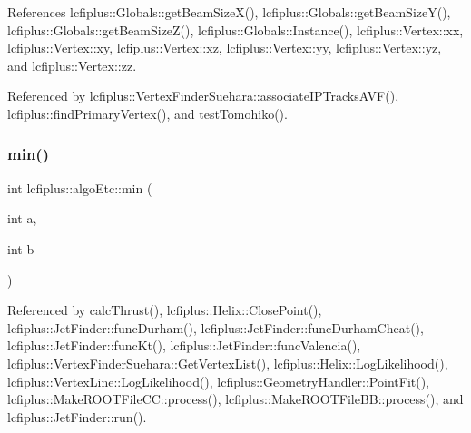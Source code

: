 References lcfiplus\+::\+Globals\+::get\+Beam\+Size\+X(), lcfiplus\+::\+Globals\+::get\+Beam\+Size\+Y(), lcfiplus\+::\+Globals\+::get\+Beam\+Size\+Z(), lcfiplus\+::\+Globals\+::\+Instance(), lcfiplus\+::\+Vertex\+::xx, lcfiplus\+::\+Vertex\+::xy, lcfiplus\+::\+Vertex\+::xz, lcfiplus\+::\+Vertex\+::yy, lcfiplus\+::\+Vertex\+::yz, and lcfiplus\+::\+Vertex\+::zz.



Referenced by lcfiplus\+::\+Vertex\+Finder\+Suehara\+::associate\+I\+P\+Tracks\+A\+V\+F(), lcfiplus\+::find\+Primary\+Vertex(), and test\+Tomohiko().

\mbox{\label{namespacelcfiplus_1_1algoEtc_aae88816dd58310d90c39512aa706c2ba}} 
\subsubsection{min()}
{\footnotesize\ttfamily int lcfiplus\+::algo\+Etc\+::min (\begin{DoxyParamCaption}\item[{int}]{a,  }\item[{int}]{b }\end{DoxyParamCaption})}



Referenced by calc\+Thrust(), lcfiplus\+::\+Helix\+::\+Close\+Point(), lcfiplus\+::\+Jet\+Finder\+::func\+Durham(), lcfiplus\+::\+Jet\+Finder\+::func\+Durham\+Cheat(), lcfiplus\+::\+Jet\+Finder\+::func\+Kt(), lcfiplus\+::\+Jet\+Finder\+::func\+Valencia(), lcfiplus\+::\+Vertex\+Finder\+Suehara\+::\+Get\+Vertex\+List(), lcfiplus\+::\+Helix\+::\+Log\+Likelihood(), lcfiplus\+::\+Vertex\+Line\+::\+Log\+Likelihood(), lcfiplus\+::\+Geometry\+Handler\+::\+Point\+Fit(), lcfiplus\+::\+Make\+R\+O\+O\+T\+File\+C\+C\+::process(), lcfiplus\+::\+Make\+R\+O\+O\+T\+File\+B\+B\+::process(), and lcfiplus\+::\+Jet\+Finder\+::run().

\mbox{\label{namespacelcfiplus_1_1algoEtc_a928ed8058f3609e3bed237387067dc9c}} 
